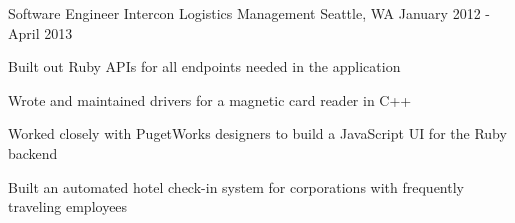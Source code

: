 \begin{cventries}
  \cventry
    {Software Engineer} %
    {Intercon Logistics Management} %
    {Seattle, WA} %
    {January 2012 - April 2013} %
    {
      \begin{cvitems} %
        \item {Built out Ruby APIs for all endpoints needed in the application}
        \item {Wrote and maintained drivers for a magnetic card reader in C++}
        \item {Worked closely with PugetWorks designers to build a JavaScript UI for the Ruby backend}
        \item {Built an automated hotel check-in system for corporations with frequently traveling employees}
      \end{cvitems}
    }

\end{cventries}
